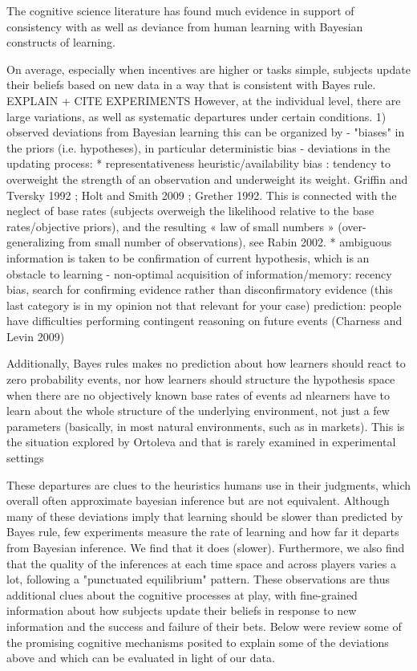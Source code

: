 The cognitive science literature has found much evidence in support of consistency with as well as deviance from human learning with Bayesian constructs of learning. 

On average, especially when incentives are higher or tasks simple, subjects update their beliefs based on new data in a way that is consistent with Bayes rule. EXPLAIN + CITE EXPERIMENTS
However, at the individual level, there are large variations, as well as systematic departures under certain conditions. 
1) observed deviations from Bayesian learning
this can be organized by 
- "biases" in the priors (i.e. hypotheses), in particular deterministic bias
- deviations in the updating process: 
* representativeness heuristic/availability bias : tendency to overweight the strength of an observation and underweight its weight. Griffin and Tversky 1992 ; Holt and Smith 2009 ; Grether 1992. This is connected with the neglect of base rates (subjects overweigh the likelihood relative to the base rates/objective priors), and the resulting « law of small numbers » (over-generalizing from small number of observations), see Rabin 2002.
* ambiguous information is taken to be confirmation of current hypothesis, which is an obstacle to learning
- non-optimal acquisition of information/memory: recency bias, search for confirming evidence rather than disconfirmatory evidence (this last category is in my opinion not that relevant for your case)
prediction: people have difficulties performing contingent reasoning on future events (Charness and Levin 2009)

Additionally, Bayes rules makes no prediction about how learners should react to zero probability events, nor how learners should structure the hypothesis space when there are no objectively known base rates of events ad nlearners have to learn about the whole structure of the underlying environment, not just a few parameters (basically, in most natural environments, such as in markets). This is the situation explored by Ortoleva and that is rarely examined in experimental settings

These departures are clues to the heuristics humans use in their judgments, which overall often approximate bayesian inference but are not equivalent. 
Although many of these deviations imply that learning should be slower than predicted by Bayes rule,  few experiments measure the rate of learning and how far it departs from Bayesian inference. We find that it does (slower). Furthermore, we also find that the quality of the inferences at each time space and across players varies a lot, following a "punctuated equilibrium" pattern. These observations are thus additional clues about the cognitive processes at play, with fine-grained information about how subjects update their beliefs in response to new information and the success and failure of their bets. Below were review some of the promising cognitive mechanisms posited to explain some of the deviations above and which can be evaluated in light of our data.

